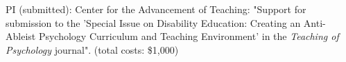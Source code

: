 

\item PI (submitted):  Center for the Advancement of Teaching: "Support for submission to the 'Special Issue on Disability Education: Creating an Anti-Ableist Psychology Curriculum and Teaching Environment' in the \textit{Teaching of Psychology} journal". (total costs: \$1,000)


%
%
